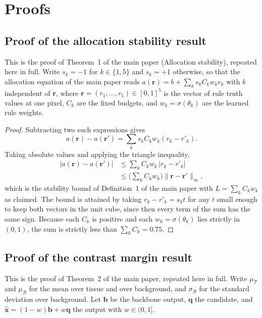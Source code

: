 \section{Proofs}
\label{sec:supp_proof}

\subsection{Proof of the allocation stability result}
\label{sec:supp_proof_stability}
This is the proof of Theorem~1 of the main paper (Allocation stability), repeated here in full.
Write $s_k = -1$ for $k \in \{1,5\}$ and $s_k = +1$ otherwise, so that the allocation equation of the
main paper reads $a(\mathbf{r}) = b + \sum_{k} s_k C_k w_k r_k$ with $b$ independent of $\mathbf{r}$,
where $\mathbf{r} = (r_1, \ldots, r_5) \in [0,1]^5$ is the vector of rule truth values at one pixel,
$C_k$ are the fixed budgets, and $w_k = \sigma(\theta_k)$ are the learned rule weights.

\begin{proof}
Subtracting two such expressions gives
\begin{equation*}
a(\mathbf{r}) - a(\mathbf{r}') = \sum_{k} s_k C_k w_k (r_k - r'_k).
\end{equation*}
Taking absolute values and applying the triangle inequality,
\begin{equation*}
\begin{split}
\big| a(\mathbf{r}) - a(\mathbf{r}') \big|
&\le \sum_{k} C_k w_k \, |r_k - r'_k| \\
&\le \Big( \sum_{k} C_k w_k \Big) \lVert \mathbf{r} - \mathbf{r}' \rVert_\infty ,
\end{split}
\end{equation*}
which is the stability bound of Definition~1 of the main paper with $L = \sum_k C_k w_k$ as claimed.
The bound is attained by taking $r_k - r'_k = s_k t$ for any $t$ small enough to keep both vectors in
the unit cube, since then every term of the sum has the same sign. Because each $C_k$ is positive and
each $w_k = \sigma(\theta_k)$ lies strictly in $(0,1)$, the sum is strictly less than
$\sum_k C_k = 0.75$.
\end{proof}

\subsection{Proof of the contrast margin result}
\label{sec:supp_proof_cnr}
This is the proof of Theorem~2 of the main paper, repeated here in full. Write
$\mu_\mathcal{T}$ and $\mu_\mathcal{B}$ for the mean over tissue and over background, and
$\sigma_\mathcal{B}$ for the standard deviation over background. Let $\mathbf{b}$ be the backbone
output, $\mathbf{q}$ the candidate, and $\hat{\mathbf{x}} = (1-w)\mathbf{b} + w\mathbf{q}$ the output
with $w \in (0,1]$.

